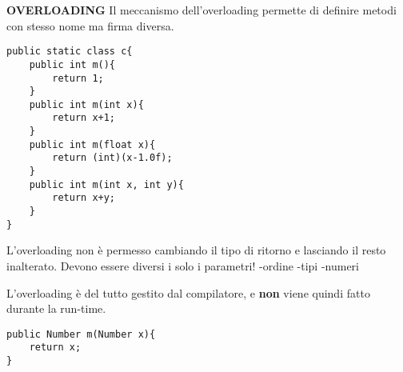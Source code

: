 \noindent \textbf{OVERLOADING} \newline
Il meccanismo dell'overloading permette di definire metodi con stesso nome ma firma diversa. 

\begin{lstlisting}[basicstyle=\small,]
public static class c{
	public int m(){
		return 1;
	}
	public int m(int x){
		return x+1;
	}
	public int m(float x){
		return (int)(x-1.0f);
	}
	public int m(int x, int y){
		return x+y;
	}		
}
\end{lstlisting}

\noindent L'overloading non è permesso cambiando il tipo di ritorno e lasciando il resto inalterato. Devono essere diversi i solo i parametri! \newline
-ordine \newline
-tipi \newline
-numeri \newline

\noindent L'overloading è del tutto gestito dal compilatore, e \textbf{non} viene quindi fatto durante la run-time.

\begin{lstlisting}[basicstyle=\small,]
public Number m(Number x){
	return x;
}
\end{lstlisting}























